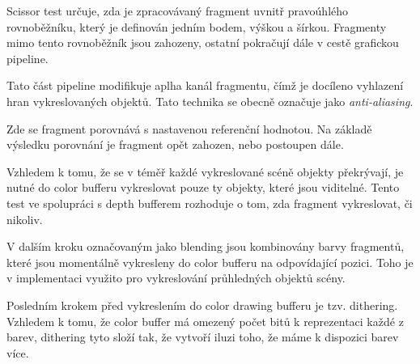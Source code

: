 Scissor test určuje, zda je zpracovávaný fragment uvnitř pravoúhlého rovnoběžníku, který je definován jedním bodem, výškou a šírkou. Fragmenty mimo tento rovnoběžník jsou zahozeny, ostatní pokračují dále v cestě grafickou pipeline.

Tato část pipeline modifikuje aplha kanál fragmentu, čímž je docíleno vyhlazení hran vykreslovaných objektů. Tato technika se obecně označuje jako \textit{anti-aliasing}.

Zde se fragment porovnává s nastavenou referenční hodnotou. Na základě výsledku porovnání je fragment opět zahozen, nebo postoupen dále.

Vzhledem k tomu, že se v téměř každé vykreslované scéně objekty překrývají, je nutné do color bufferu vykreslovat pouze ty objekty, které jsou viditelné. Tento test ve spolupráci s depth bufferem rozhoduje o tom, zda fragment vykreslovat, či nikoliv.

V dalším kroku označovaným jako blending jsou kombinovány barvy fragmentů, které jsou momentálně vykresleny do color bufferu na odpovídající pozici. Toho je v implementaci využito pro vykreslování průhledných objektů scény.

Posledním krokem před vykreslením do color drawing bufferu je tzv. dithering. Vzhledem k tomu, že color buffer má omezený počet bitů k reprezentaci každé z barev, dithering tyto složí tak, že vytvoří iluzi toho, že máme k dispozici barev více.



